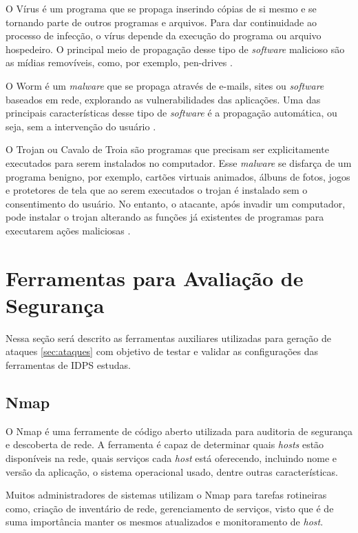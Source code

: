 \documentclass[
	12pt,				
	openright,		
	twoside,	
	a4paper,
	english,	
	brazil	
	]{abntex2}
\begin{document}
 O Vírus é um programa que se propaga inserindo cópias de si mesmo e se tornando parte de outros programas e arquivos. Para dar continuidade ao processo de infecção, o vírus depende da execução do programa ou arquivo hospedeiro. O principal meio de propagação desse tipo de \textit{software} malicioso são as mídias removíveis, como, por exemplo, pen-drives \cite{certs-malwares}.

O Worm é um \textit{malware} que se propaga através de e-mails, sites ou \textit{software} baseados em rede, explorando as vulnerabilidades das aplicações. Uma das principais características desse tipo de \textit{software} é a propagação automática, ou seja, sem a intervenção do usuário \cite{detectingworm}. 

O Trojan ou Cavalo de Troia são programas que precisam ser explicitamente executados para serem instalados no computador. Esse \textit{malware} se disfarça de um programa benigno, por exemplo, cartões virtuais animados, álbuns de fotos, jogos e protetores de tela que ao serem executados o trojan é instalado sem o consentimento do usuário. No entanto, o atacante, após invadir um computador, pode instalar o trojan  alterando as funções já existentes de programas para executarem ações maliciosas \cite{certs-malwares}.

 \section{Ferramentas para Avaliação de Segurança} \label{sec:ferramentas}

 Nessa seção será descrito as ferramentas auxiliares utilizadas para geração de ataques \ref{sec:ataques} com objetivo de testar e validar as configurações das ferramentas de IDPS estudas. 

 \subsection{Nmap} \label{sec:nmap}

 O Nmap é uma ferramente de código aberto utilizada para auditoria de segurança e descoberta de rede. A ferramenta é capaz de determinar quais \textit{hosts} estão disponíveis na rede, quais serviços cada \textit{host} está oferecendo, incluindo nome e versão da aplicação, o sistema operacional usado, dentre outras características.  

 Muitos administradores de sistemas utilizam o Nmap para tarefas rotineiras como, criação de inventário de rede, gerenciamento de serviços, visto que é de suma importância manter os mesmos atualizados e monitoramento de \textit{host}.
\end{document}
